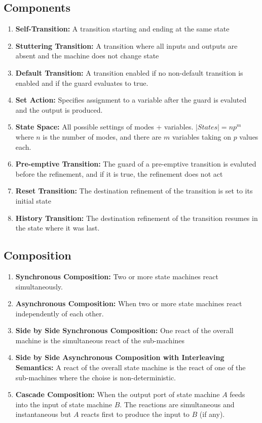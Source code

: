 \documentclass{article}
\newcommand{\defn}[1]{\textbf{#1:}}
\begin{document}
\subsection*{Components}
\begin{enumerate}
  \item [] \defn{Self-Transition} A transition starting and ending at the same state
  \item [] \defn{Stuttering Transition} A transition where all inputs and outputs are absent and the machine does not change state
  \item [] \defn{Default Transition} A transition enabled if no non-default transition is enabled and if the guard evaluates to true.
  \item [] \defn{Set Action} Specifies assignment to a variable after the guard is evaluted and the output is produced.
  \item [] \defn{State Space} All possible settings of modes + variables. $|States| = np^m$ where $n$ is the number of modes, and there are $m$ variables taking on $p$ values each.
  \item [] \defn{Pre-emptive Transition} The guard of a pre-emptive transition is evaluted before the refinement, and if it is true, the refinement does not act
  \item [] \defn{Reset Transition} The destination refinement of the transition is set to its initial state
  \item [] \defn{History Transition} The destination refinement of the transition resumes in the state where it was last.
\end{enumerate}
\subsection*{Composition}
\begin{enumerate}
  \item[] \defn{Synchronous Composition} Two or more state machines react simultaneously.
  \item[] \defn{Asynchronous Composition} When two or more state machines react independently of each other.
  \item[] \defn{Side by Side Synchronous Composition} One react of the overall machine is the simultaneous react of the sub-machines
  \item[] \defn{Side by Side Asynchronous Composition with Interleaving Semantics} A react of the overall state machine is the react of one of the sub-machines where the choise is non-deterministic.
  \item[] \defn{Cascade Composition} When the output port of state machine $A$ feeds into the input of state machine $B$. The reactions are simultaneous and instantaneous but $A$ reacts first to produce the input to $B$ (if any).
\end{enumerate}
\end{document}
